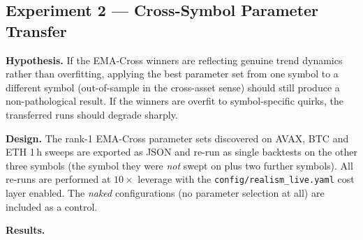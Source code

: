 \documentclass[a4paper, 12pt, titlepage]{article}
\begin{document}
\subsection{Experiment 2 --- Cross-Symbol Parameter Transfer}

\textbf{Hypothesis.} If the EMA-Cross winners are reflecting genuine
trend dynamics rather than overfitting, applying the best
parameter set from one symbol to a different symbol (out-of-sample
in the cross-asset sense) should still produce a non-pathological
result. If the winners are overfit to symbol-specific quirks, the
transferred runs should degrade sharply.

\textbf{Design.} The rank-1 EMA-Cross parameter sets discovered on
AVAX, BTC and ETH 1\,h sweeps are exported as JSON and re-run as
single backtests on the other three symbols (the symbol they were
\emph{not} swept on plus two further symbols). All re-runs are
performed at $10\times$ leverage with the
\texttt{config/realism\_live.yaml} cost layer enabled. The
\textit{naked} configurations (no parameter selection at all) are
included as a control.

\textbf{Results.}
\end{document}

